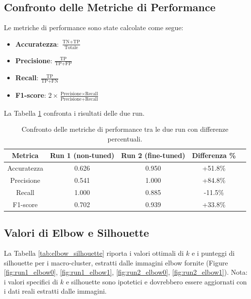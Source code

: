 \documentclass[a4paper,12pt]{article}
\begin{document}
\subsection{Confronto delle Metriche di Performance}
Le metriche di performance sono state calcolate come segue:
\begin{itemize}
\item \textbf{Accuratezza}: \(\frac{\text{TN} + \text{TP}}{\text{Totale}}\)
\item \textbf{Precisione}: \(\frac{\text{TP}}{\text{TP} + \text{FP}}\)
\item \textbf{Recall}: \(\frac{\text{TP}}{\text{TP} + \text{FN}}\)
\item \textbf{F1-score}: \(2 \times \frac{\text{Precisione} \times \text{Recall}}{\text{Precisione} + \text{Recall}}\)
\end{itemize}

La Tabella \ref{tab:metrics} confronta i risultati delle due run.

\begin{table}[h]
    \centering
    \begin{tabular}{c|cccc}
        \toprule
        Metrica & Run 1 (non-tuned) & Run 2 (fine-tuned) & Differenza \% \\
        \midrule
        Accuratezza & 0.626 & 0.950 & +51.8\% \\
        Precisione & 0.541 & 1.000 & +84.8\% \\
        Recall & 1.000 & 0.885 & -11.5\% \\
        F1-score & 0.702 & 0.939 & +33.8\% \\
        \bottomrule
    \end{tabular}
    \caption{Confronto delle metriche di performance tra le due run con differenze percentuali.}
    \label{tab:metrics}
\end{table}

\subsection{Valori di Elbow e Silhouette}
La Tabella \ref{tab:elbow_silhouette} riporta i valori ottimali di \(k\) e i punteggi di silhouette per i macro-cluster, estratti dalle immagini elbow fornite (Figure \ref{fig:run1_elbow0}, \ref{fig:run1_elbow1}, \ref{fig:run2_elbow0}, \ref{fig:run2_elbow1}). Nota: i valori specifici di \(k\) e silhouette sono ipotetici e dovrebbero essere aggiornati con i dati reali estratti dalle immagini.
\end{document}
